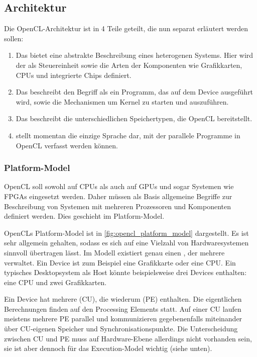\subsection{Architektur}

Die OpenCL-Architektur ist in 4 Teile geteilt, die nun separat
erläutert werden sollen:

\begin{enumerate}
\item Das  bietet eine abstrakte
Beschreibung eines heterogenen Systems. Hier wird der
 als Steuereinheit sowie die Arten der
Komponenten wie Grafikkarten, CPUs und integrierte Chips definiert.
\item Das  beschreibt den Begriff
 als ein Programm, das auf dem Device ausgeführt wird, sowie die
Mechanismen um Kernel zu starten und auszuführen.
\item Das  beschreibt die unterschiedlichen Speichertypen, die
OpenCL bereitstellt.
\item {} stellt momentan die einzige Sprache
dar, mit der parallele Programme in OpenCL verfasst werden können.
\end{enumerate}

\subsubsection{Platform-Model}

OpenCL soll sowohl auf CPUs als auch auf GPUs und sogar
 Systemen wie FPGAs eingesetzt
werden. Daher müssen als Basis allgemeine Begriffe zur Beschreibung
von Systemen mit mehreren Prozessoren und Komponenten definiert
werden. Dies geschieht im Platform-Model.

OpenCLs Platform-Model ist in \autoref{fig:opencl_platform_model}
dargestellt. Es ist sehr allgemein gehalten, sodass es sich auf eine
Vielzahl von Hardwaresystemen sinnvoll übertragen lässt. Im Modell
existiert genau einen , der mehrere
 verwaltet. Ein Device ist zum Beispiel eine
Grafikkarte oder eine CPU. Ein typisches Desktopsystem als Host könnte
beispielsweise drei Devices enthalten: eine CPU und zwei Grafikkarten.

Ein Device hat mehrere  (CU), die
wiederum  (PE) enthalten. Die
eigentlichen Berechnungen finden auf den Processing Elements
statt. Auf einer CU laufen meistens mehrere PE parallel und
kommunizieren gegebenenfalls miteinander über CU-eigenen Speicher und
Synchronisationspunkte. Die Unterscheidung zwischen CU und PE muss auf
Hardware-Ebene allerdings nicht vorhanden sein, sie ist aber dennoch
für das Execution-Model wichtig (siehe unten).


